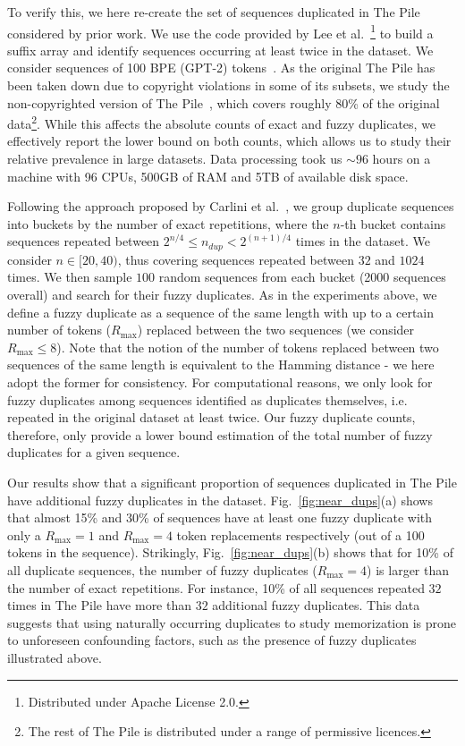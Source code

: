 To verify this, we here re-create the set of sequences duplicated in The Pile considered by prior work. We use the code provided by Lee et al.~\cite{lee2022deduplicating}\footnote{Distributed under Apache License 2.0.} to build a suffix array and identify sequences occurring at least twice in the dataset. We consider sequences of 100 BPE (GPT-2) tokens~\cite{radford2019language}. As the original The Pile has been taken down due to copyright violations in some of its subsets, we study the non-copyrighted version of The Pile~\cite{pile_uncopyrighted}, which covers roughly 80\% of the original data\footnote{The rest of The Pile is distributed under a range of permissive licences.}. While this affects the absolute counts of exact and fuzzy duplicates, we effectively report the lower bound on both counts, which allows us to study their relative prevalence in large datasets. Data processing took us $\sim96$ hours on a machine with 96 CPUs, 500GB of RAM and 5TB of available disk space.

Following the approach proposed by Carlini et al.~\cite{carlini2022quantifying}, we group duplicate sequences into buckets by the number of exact repetitions, where the $n$-th bucket contains sequences repeated between $2^{n/4} \leq n_{dup} < 2^{(n+1)/4}$ times in the dataset. We consider $n \in [20, 40)$, thus covering sequences repeated between $32$ and $1024$ times. We then sample $100$ random sequences from each bucket (2000 sequences overall) and search for their fuzzy duplicates. As in the experiments above, we define a fuzzy duplicate as a sequence of the same length with up to a certain number of tokens ($R_\text{max}$) replaced between the two sequences (we consider $R_\text{max} \leq 8$). Note that the notion of the number of tokens replaced between two sequences of the same length is equivalent to the Hamming distance - we here adopt the former for consistency.  
For computational reasons, we only look for fuzzy duplicates among sequences identified as duplicates themselves, i.e. repeated in the original dataset at least twice. Our fuzzy duplicate counts, therefore, only provide a lower bound estimation of the total number of fuzzy duplicates for a given sequence.

Our results show that a significant proportion of sequences duplicated in The Pile have additional fuzzy duplicates in the dataset. Fig.~\ref{fig:near_dups}(a) shows that almost 15\% and 30\% of sequences have at least one fuzzy duplicate with only a $R_\text{max}=1$ and $R_\text{max}=4$ token replacements respectively (out of a 100 tokens in the sequence). Strikingly, Fig.~\ref{fig:near_dups}(b) shows that for 10\% of all duplicate sequences, the number of fuzzy duplicates ($R_\text{max}=4$) is larger than the number of exact repetitions. For instance, 10\% of all sequences repeated $32$ times in The Pile have more than $32$ additional fuzzy duplicates. This data suggests that using naturally occurring duplicates to study memorization is prone to unforeseen confounding factors, such as the presence of fuzzy duplicates illustrated above.